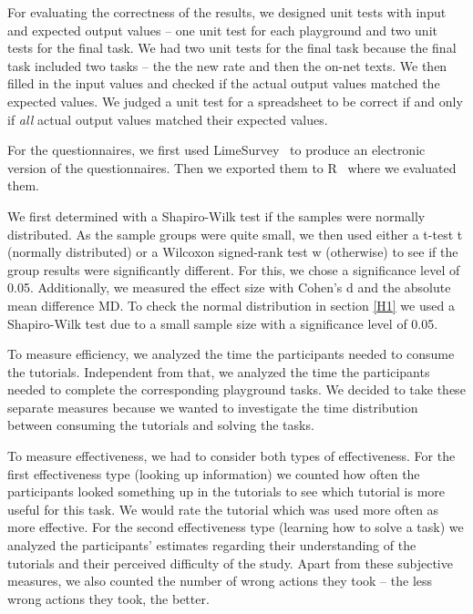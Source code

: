 For evaluating the correctness of the results, we designed unit tests with input and expected output values -- one unit test for each playground and two unit tests for the final task. We had two unit tests for the final task because the final task included two tasks -- the the new rate and then the on-net texts. We then filled in the input values and checked if the actual output values matched the expected values. We judged a unit test for a spreadsheet to be correct if and only if \emph{all} actual output values matched their expected values.

For the questionnaires, we first used LimeSurvey~\cite{limesurvey} to produce an electronic version of the questionnaires. Then we exported them to R~\cite{r} where we evaluated them. 

We first determined with a Shapiro-Wilk test if the samples were normally distributed. As the sample groups were quite small, we then used either a t-test t (normally distributed) or a Wilcoxon signed-rank test w (otherwise) to see if the group results were significantly different. For this, we chose a significance level of 0.05. Additionally, we measured the effect size with Cohen's d and the absolute mean difference MD. 
To check the normal distribution in section \ref{H1} we used a Shapiro-Wilk test due to a small sample size with a significance level of 0.05. 

To measure efficiency, we analyzed the time the participants needed to consume the tutorials. Independent from that, we analyzed the time the participants needed to complete the corresponding playground tasks. We decided to take these separate measures because we wanted to investigate the time distribution between consuming the tutorials and solving the tasks.

To measure effectiveness, we had to consider both types of effectiveness. For the first effectiveness type (looking up information) we counted how often the participants looked something up in the tutorials to see which tutorial is more useful for this task. We would rate the tutorial which was used more often as more effective. For the second effectiveness type (learning how to solve a task) we analyzed the participants' estimates regarding their understanding of the tutorials and their perceived difficulty of the study. Apart from these subjective measures, we also counted the number of wrong actions they took -- the less wrong actions they took, the better.





